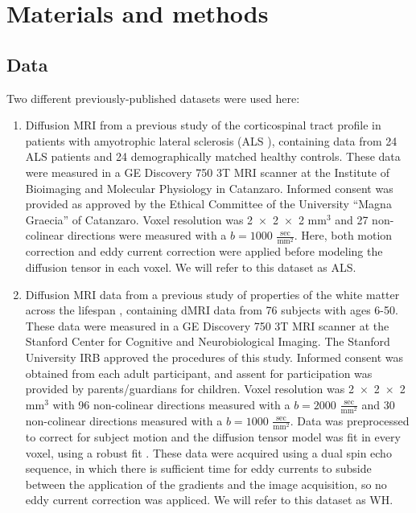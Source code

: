\section*{Materials and methods}

\subsection*{Data}

Two different previously-published datasets were used here:

\begin{enumerate}

\item Diffusion MRI from a previous study of the corticospinal
tract profile in patients with amyotrophic lateral sclerosis
(ALS \cite{sarica2017corticospinal}), containing data from 24 ALS
patients and 24 demographically matched healthy controls. These data
were measured in a GE Discovery 750 3T MRI scanner at the Institute
of Bioimaging and Molecular Physiology in Catanzaro. Informed consent
was provided as approved by the Ethical Committee of the University
``Magna Graecia'' of Catanzaro. Voxel resolution was \num{2x2x2}
$\text{mm}^3$ and 27 non-colinear directions were measured with a
$b=1000$ $\frac{\text{sec}}{\text{mm}^2}$. Here, both motion correction
and eddy current correction were applied before modeling the diffusion
tensor in each voxel. We will refer to this dataset as ALS.

\item Diffusion MRI data from a previous study of properties of
the white matter across the lifespan \cite{yeatman2014lifespan},
containing dMRI data from 76 subjects with ages 6-50. These data were
measured in a GE Discovery 750 3T MRI scanner at the Stanford Center
for Cognitive and Neurobiological Imaging. The Stanford University
IRB approved the procedures of this study. Informed consent was
obtained from each adult participant, and assent for participation
was provided by parents/guardians for children. Voxel resolution was
\num{2x2x2}$\text{mm}^3$ with 96 non-colinear directions measured with a
$b=2000$ $\frac{\text{sec}}{\text{mm}^2}$ and 30 non-colinear directions
measured with a $b=1000$ $\frac{\text{sec}}{\text{mm}^2}$. Data was
preprocessed to correct for subject motion and the diffusion tensor
model \cite{basser1994mr} was fit in every voxel, using a robust fit
\cite{chang2005restore}. These data were acquired using a dual spin echo
sequence, in which there is sufficient time for eddy currents to subside
between the application of the gradients and the image acquisition, so
no eddy current correction was appliced. We will refer to this dataset
as WH.

\end{enumerate}

